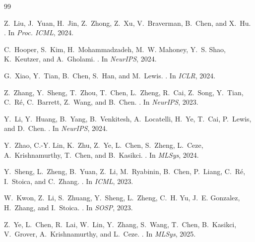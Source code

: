 \documentclass{article}
\begin{document}
\begingroup
\renewcommand{\section}[2]{}
\begin{thebibliography}{99}

Z.~Liu, J.~Yuan, H.~Jin, Z.~Zhong, Z.~Xu, V.~Braverman, B.~Chen, and X.~Hu.
.
\newblock In {\em Proc. ICML}, 2024.

C.~Hooper, S.~Kim, H.~Mohammadzadeh, M.~W. Mahoney, Y.~S. Shao, K.~Keutzer, and
  A.~Gholami.
.
\newblock In {\em NeurIPS}, 2024.

G.~Xiao, Y.~Tian, B.~Chen, S.~Han, and M.~Lewis.
.
\newblock In {\em ICLR}, 2024.

Z.~Zhang, Y.~Sheng, T.~Zhou, T.~Chen, L.~Zheng, R.~Cai, Z.~Song, Y.~Tian,
  C.~R{\'e}, C.~Barrett, Z.~Wang, and B.~Chen.
.
\newblock In {\em NeurIPS}, 2023.

Y.~Li, Y.~Huang, B.~Yang, B.~Venkitesh, A.~Locatelli, H.~Ye, T.~Cai, P.~Lewis,
  and D.~Chen.
.
\newblock In {\em NeurIPS}, 2024.

Y.~Zhao, C.-Y. Lin, K.~Zhu, Z.~Ye, L.~Chen, S.~Zheng, L.~Ceze, A.~Krishnamurthy,
  T.~Chen, and B.~Kasikci.
.
\newblock In {\em MLSys}, 2024.

Y.~Sheng, L.~Zheng, B.~Yuan, Z.~Li, M.~Ryabinin, B.~Chen, P.~Liang, C.~R{\'e},
  I.~Stoica, and C.~Zhang.
.
\newblock In {\em ICML}, 2023.

W.~Kwon, Z.~Li, S.~Zhuang, Y.~Sheng, L.~Zheng, C.~H. Yu, J.~E. Gonzalez,
  H.~Zhang, and I.~Stoica.
.
\newblock In {\em SOSP}, 2023.

Z.~Ye, L.~Chen, R.~Lai, W.~Lin, Y.~Zhang, S.~Wang, T.~Chen, B.~Kasikci,
  V.~Grover, A.~Krishnamurthy, and L.~Ceze.
.
\newblock In {\em MLSys}, 2025.


\end{thebibliography}
\end{document}
